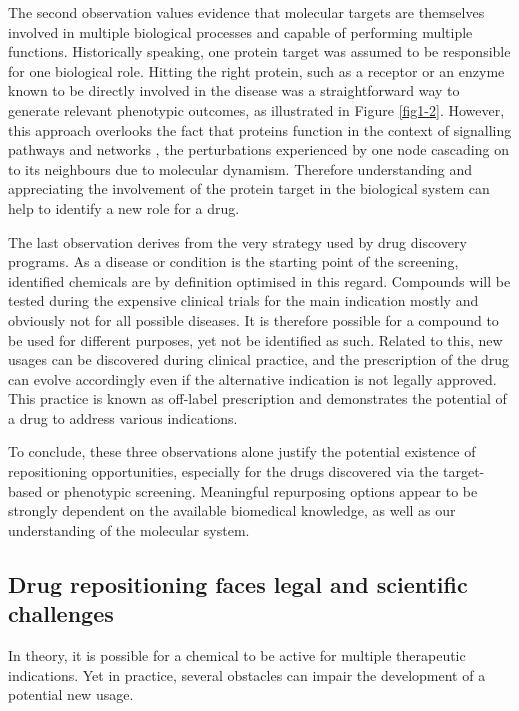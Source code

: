 The second observation values evidence that molecular targets are themselves involved in multiple biological processes and capable of performing multiple functions. Historically speaking, one protein target was assumed to be responsible for one biological role. Hitting the right protein, such as a receptor or an enzyme known to be directly involved in the disease was a straightforward way to generate relevant phenotypic outcomes, as illustrated in Figure \ref{fig1-2}. However, this approach overlooks the fact that proteins function in the context of signalling pathways and networks \citep{hopkins2008network} \citep{barabasi2004network}, the perturbations experienced by one node cascading on to its neighbours due to molecular dynamism. Therefore understanding and appreciating the involvement of the protein target in the biological system can help to identify a new role for a drug.

The last observation derives from the very strategy used by drug discovery programs. As a disease or condition is the starting point of the screening, identified chemicals are by definition optimised in this regard. Compounds will be tested during the expensive clinical trials for the main indication mostly and obviously not for all possible diseases. It is therefore possible for a compound to be used for different purposes, yet not be identified as such. Related to this, new usages can be discovered during clinical practice, and the prescription of the drug can evolve accordingly even if the alternative indication is not legally approved. This practice is known as off-label prescription \citep{offlabelwiki} and demonstrates the potential of a drug to address various indications.

To conclude, these three observations alone justify the potential existence of repositioning opportunities, especially for the drugs discovered via the target-based or phenotypic screening. Meaningful repurposing options appear to be strongly dependent on the available biomedical knowledge, as well as our understanding of the molecular system.

\subsection{Drug repositioning faces legal and scientific challenges}
In theory, it is possible for a chemical to be active for multiple therapeutic indications. Yet in practice, several obstacles can impair the development of a potential new usage.

